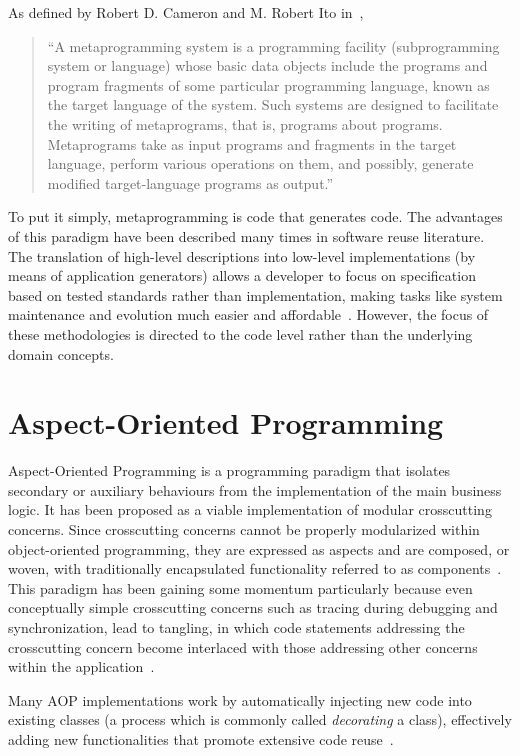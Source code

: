 As defined by Robert D. Cameron and M. Robert Ito in~\cite{CI84},

\begin{quote}
 ``A metaprogramming system is a programming facility (subprogramming system or language) whose basic data objects include the programs and program fragments of some particular programming language, known as the target language of the system. Such systems are designed to facilitate the writing of metaprograms, that is, programs about programs. Metaprograms take as input programs and fragments in the target language, perform various operations on them, and possibly, generate modified target-language programs as output.''
\end{quote}

To put it simply, metaprogramming is code that generates code. The advantages of this paradigm have been described many times in software reuse literature. The translation of high-level descriptions into low-level implementations (by means of application generators) allows a developer to focus on specification based on tested standards rather than implementation, making tasks like system maintenance and evolution much easier and affordable~\cite{Bas87, Cle88}. However, the focus of these methodologies is directed to the code level rather than the underlying domain concepts.

\section{Aspect-Oriented Programming}\label{sec:aspect_oriented_programming}

Aspect-Oriented Programming is a programming paradigm that isolates secondary or auxiliary behaviours from the implementation of the main business logic. It has been proposed as a viable implementation of modular crosscutting concerns. Since crosscutting concerns cannot be properly modularized within object-oriented programming, they are expressed as aspects and are composed, or woven, with traditionally encapsulated functionality referred to as components~\cite{KM05, Ste06}. This paradigm has been gaining some momentum particularly because even conceptually simple crosscutting concerns such as tracing during debugging and synchronization, lead to tangling, in which code statements addressing the crosscutting concern become interlaced with those addressing other concerns within the application~\cite{LC03}.

Many AOP implementations work by automatically injecting new code into existing classes (a process which is commonly called \emph{decorating} a class), effectively adding new functionalities that promote extensive code reuse~\cite{Ste06, LC03, metaclass_programming_in_python}.

